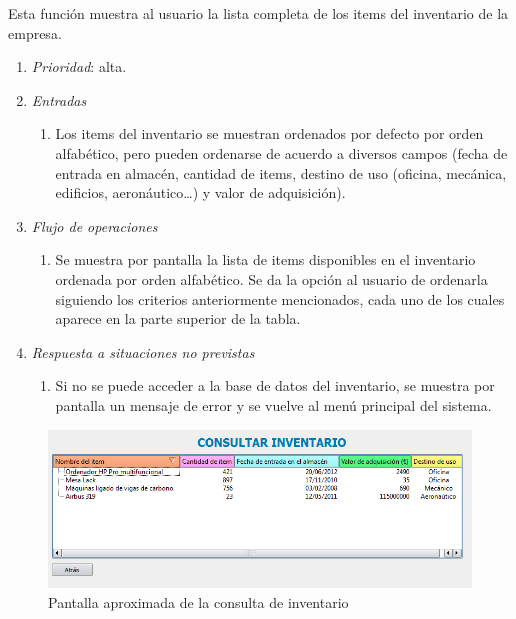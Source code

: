 
 \label{fun:consultarinventario}
	Esta función muestra al usuario la lista completa de los items del inventario de la empresa.
		
	\begin{enumerate}
		\item \textit{Prioridad}: alta.
		\item \textit{Entradas}
		\begin{enumerate}
			\item Los items del inventario se muestran ordenados por defecto por orden alfabético, pero pueden ordenarse de acuerdo a diversos campos (fecha de entrada en almacén, cantidad de items, destino de uso (oficina, mecánica, edificios, aeronáutico\ldots) y valor de adquisición).
		\end{enumerate}
		\item \textit{Flujo de operaciones}
		\begin{enumerate}
			\item Se muestra por pantalla la lista de items disponibles en el inventario ordenada por orden alfabético. Se da la opción al usuario de ordenarla siguiendo los criterios anteriormente mencionados, cada uno de los cuales aparece en la parte superior de la tabla.
		\end{enumerate}
		\item \textit{Respuesta a situaciones no previstas}
		\begin{enumerate}
			\item Si no se puede acceder a la base de datos del inventario, se muestra por pantalla un mensaje de error y se vuelve al menú principal del sistema.
		\end{enumerate}
	\end{enumerate}
	
\begin{figure}[ht]\centering
\includegraphics[scale=.6]{imagenes/consultarInventarioImagen.png}
\caption{Pantalla aproximada de la consulta de inventario}
\end{figure}
